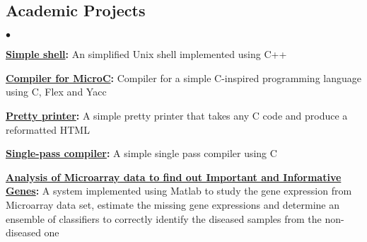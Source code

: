 \documentclass[margin,line]{res}
\newenvironment{list2}{
  \begin{list}{$\bullet$}{%
      \setlength{\itemsep}{0in}
      \setlength{\parsep}{0in} \setlength{\parskip}{0in}
      \setlength{\topsep}{0in} \setlength{\partopsep}{0in} 
      \setlength{\leftmargin}{0.2in}}}{\end{list}}
\begin{document}
\begin{resume}
\section{\sc Academic Projects}
\begin{list2}
\item {\bf \href{https://github.com/sb17v/simple_shell}{Simple shell}:} An 
simplified Unix shell implemented using C++
\item {\bf \href{https://github.com/sb17v/micro-C_compiler}{Compiler for 
MicroC}:} Compiler for a simple C-inspired programming 
language using C, Flex and Yacc
\item {\bf \href{https://github.com/sb17v/pretty_printer}{Pretty printer}:} A 
simple pretty printer that takes any C code and 
produce a reformatted HTML
\item {\bf \href{https://github.com/sb17v/single-pass_compiler}{Single-pass 
compiler}:} A simple single pass compiler using C
\item {\bf 
\href{https://github.com/sb17v/Analysis-of-Microarray-Data-to-find-out-Important-and-Informative-Genes}{Analysis
 of Microarray data to find out Important and Informative 
Genes}:} A system implemented using Matlab to study the gene expression from
Microarray data set, estimate the missing gene expressions and determine an 
ensemble of classifiers to correctly identify the diseased samples
from the non-diseased one
\end{list2}

\vspace*{-.18in}




\end{resume}
\end{document}
